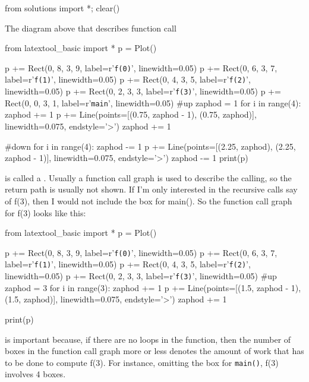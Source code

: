 \begin{python0}
from solutions import *; clear()
\end{python0}

The diagram above that describes function call
\begin{python}
from latextool_basic import *
p = Plot()

p += Rect(0, 8, 3, 9, label=r'\texttt{f(0)}', linewidth=0.05)
p += Rect(0, 6, 3, 7, label=r'\texttt{f(1)}', linewidth=0.05)
p += Rect(0, 4, 3, 5, label=r'\texttt{f(2)}', linewidth=0.05)
p += Rect(0, 2, 3, 3, label=r'\texttt{f(3)}', linewidth=0.05)
p += Rect(0, 0, 3, 1, label=r'\texttt{main}', linewidth=0.05)
#up
zaphod = 1
for i in range(4):
    zaphod += 1
    p += Line(points=[(0.75, zaphod - 1), (0.75, zaphod)], linewidth=0.075, endstyle='>')
    zaphod += 1

#down
for i in range(4):
    zaphod -= 1
    p += Line(points=[(2.25, zaphod), (2.25, zaphod - 1)], linewidth=0.075, endstyle='>')
    zaphod -= 1
print(p)
\end{python}

is called a . Usually a function call graph
is used to describe the calling, so the return path is usually not
shown. If I'm only interested in the recursive calls say of f(3), then I
would not include the box for main(). So the function call graph for
f(3) looks like this:

\begin{python}
from latextool_basic import *
p = Plot()

p += Rect(0, 8, 3, 9, label=r'\texttt{f(0)}', linewidth=0.05)
p += Rect(0, 6, 3, 7, label=r'\texttt{f(1)}', linewidth=0.05)
p += Rect(0, 4, 3, 5, label=r'\texttt{f(2)}', linewidth=0.05)
p += Rect(0, 2, 3, 3, label=r'\texttt{f(3)}', linewidth=0.05)
#up
zaphod = 3
for i in range(3):
    zaphod += 1
    p += Line(points=[(1.5, zaphod - 1), (1.5, zaphod)], linewidth=0.075, endstyle='>')
    zaphod += 1

print(p)
\end{python}

is important because, if there are no loops in the function, then the
number of boxes in the function call graph more or less denotes the
amount of work that has to be done to compute f(3). For instance,
omitting the box for \texttt{main()}, f(3) involves 4 boxes.


